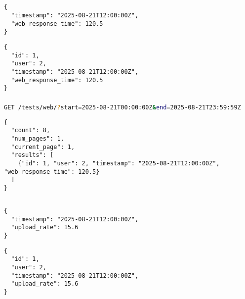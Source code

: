 \documentclass{report}
\begin{document}
\subsection{}
\subsubsection{}
\begin{latin}
\begin{lstlisting}[style=jsonstyle]
{
  "timestamp": "2025-08-21T12:00:00Z",
  "web_response_time": 120.5
}
\end{lstlisting}
\end{latin}
\textbf{}
\begin{latin}
\begin{lstlisting}[style=jsonstyle]
{
  "id": 1,
  "user": 2,
  "timestamp": "2025-08-21T12:00:00Z",
  "web_response_time": 120.5
}
\end{lstlisting}
\end{latin}

\subsubsection{}
\begin{latin}
\begin{lstlisting}[style=jsonstyle, language=bash]
GET /tests/web/?start=2025-08-21T00:00:00Z&end=2025-08-21T23:59:59Z
\end{lstlisting}
\end{latin}
\textbf{}
\begin{latin}
\begin{lstlisting}[style=jsonstyle]
{
  "count": 8,
  "num_pages": 1,
  "current_page": 1,
  "results": [
    {"id": 1, "user": 2, "timestamp": "2025-08-21T12:00:00Z", "web_response_time": 120.5}
  ]
}
\end{lstlisting}
\end{latin}

\subsection{}
\subsubsection{}
\begin{latin}
\begin{lstlisting}[style=jsonstyle]
{
  "timestamp": "2025-08-21T12:00:00Z",
  "upload_rate": 15.6
}
\end{lstlisting}
\end{latin}
\textbf{}
\begin{latin}
\begin{lstlisting}[style=jsonstyle]
{
  "id": 1,
  "user": 2,
  "timestamp": "2025-08-21T12:00:00Z",
  "upload_rate": 15.6
}
\end{lstlisting}
\end{latin}
\end{document}
